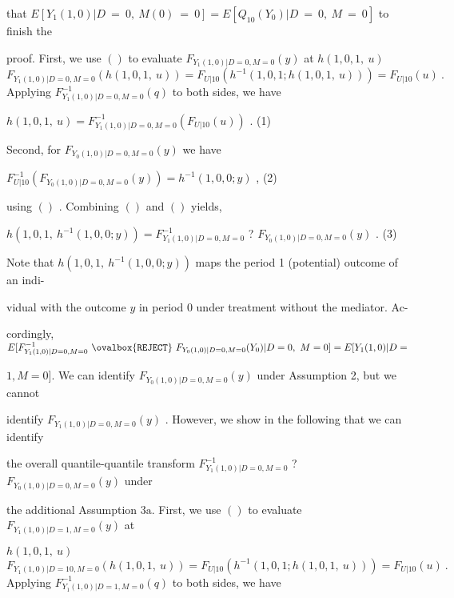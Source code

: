 \documentclass[a4paper,12pt]{article}
\begin{document}
that $E[Y_{1}(1,0)|D\ =\ 0,\ M(0)\ =\ 0] = E[Q_{10}(Y_{0})|D\ =\ 0,\ M\ =\ 0]$ to finish the

proof. First, we use $()$ to evaluate $F_{Y_{1}(1,0)|D=0,M=0}(y)$ at $h(1,0,1,\ u)$
$$
F_{Y_{1}(1,0)|D=0,M=0}(h(1,0,1,\ u))=F_{U|10}(h^{-1}(1,0,1;h(1,0,1,\ u)))=F_{U|10}(u)\ .
$$
Applying $F_{Y_{1}(1,0)|D=0,M=0}^{-1}(q)$ to both sides, we have
\begin{center}
$h(1,0,1,\ u)=F_{Y_{1}(1,0)|D=0,M=0}^{-1}(F_{U|10}(u))$ .   (1)
\end{center}
Second, for $F_{Y_{0}(1,0)|D=0,M=0}(y)$ we have
\begin{center}
$F_{U|10}^{-1}(F_{Y_{0}(1,0)|D=0,M=0}(y))=h^{-1}(1,0,0;y)$ ,   (2)
\end{center}
using $()$ . Combining $()$ and $()$ yields,
\begin{center}
$h(1,0,1,\ h^{-1}(1,0,0;y))=F_{Y_{1}(1,0)|D=0,M=0}^{-1}$ ? $F_{Y_{0}(1,0)|D=0,M=0}(y)$ .   (3)
\end{center}
Note that $h(1,0,1,\ h^{-1}(1,0,0;y))$ maps the period 1 (potential) outcome of an indi-

vidual with the outcome $y$ in period $0$ under treatment without the mediator. Ac-

cordingly, $E[F_{Y_{1}(1,0)|D=0,M=0}^{-1}\ \ovalbox{\tt\small REJECT}\ F_{Y_{0}(1,0)|D=0,M=0}(Y_{0})|D=0,\ M=0] =E[Y_{1}(1,0)|D=$

$1, M=0]$. We can identify $F_{Y_{0}(1,0)|D=0,M=0}(y)$ under Assumption 2, but we cannot

identify $F_{Y_{1}(1,0)|D=0,M=0}(y)$ . However, we show in the following that we can identify

the overall quantile-quantile transform $F_{Y_{1}(1,0)|D=0,M=0}^{-1}$ ? $F_{Y_{0}(1,0)|D=0,M=0}(y)$ under

the additional Assumption $3\mathrm{a}$. First, we use $()$ to evaluate $F_{Y_{1}(1,0)|D=1,M=0}(y)$ at

$h(1,0,1,\ u)$
$$
F_{Y_{1}(1,0)|D=10,M=0}(h(1,0,1,\ u))=F_{U|10}(h^{-1}(1,0,1;h(1,0,1,\ u)))=F_{U|10}(u)\ .
$$
Applying $F_{Y_{1}(1,0)|D=1,M=0}^{-1}(q)$ to both sides, we have
\end{document}
